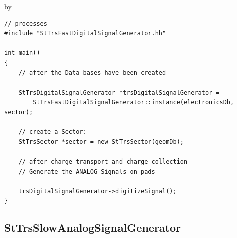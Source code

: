 \documentclass[twoside]{article}
\newcommand{\entrylabel}[1]{\mbox{\textbf{{#1}}}\hfil}%
\newenvironment{entry}
{\begin{list}{}%
    {\renewcommand{\makelabel}{\entrylabel}%
     \setlength{\labelwidth}{90pt}%
     \setlength{\leftmargin}{\labelwidth}
     \advance\leftmargin by \labelsep%
      }%
    }%
  {\end{list}}
\newcommand{\Entrylabel}[1]%
{\raisebox{0pt}[1ex][0pt]{\makebox[\labelwidth][l]%
    {\parbox[t]{\labelwidth}{\hspace{0pt}\textbf{{#1}}}}}}
\newenvironment{Entry}%
{\renewcommand{\entrylabel}{\Entrylabel}\begin{entry}}%
  {\end{entry}}
\begin{document}
\begin{Entry}
{\begin{verbatim}
// processes
#include "StTrsFastDigitalSignalGenerator.hh"

int main()
{
    // after the Data bases have been created

    StTrsDigitalSignalGenerator *trsDigitalSignalGenerator =
        StTrsFastDigitalSignalGenerator::instance(electronicsDb, sector);

    // create a Sector:
    StTrsSector *sector = new StTrsSector(geomDb);

    // after charge transport and charge collection
    // Generate the ANALOG Signals on pads

    trsDigitalSignalGenerator->digitizeSignal();
}
\end{verbatim}
}%


\end{Entry}
\clearpage


%
%
\subsection{StTrsSlowAnalogSignalGenerator} 
\label{sec:stTrsSlowAnalogSignalGenerator}
\end{document}
